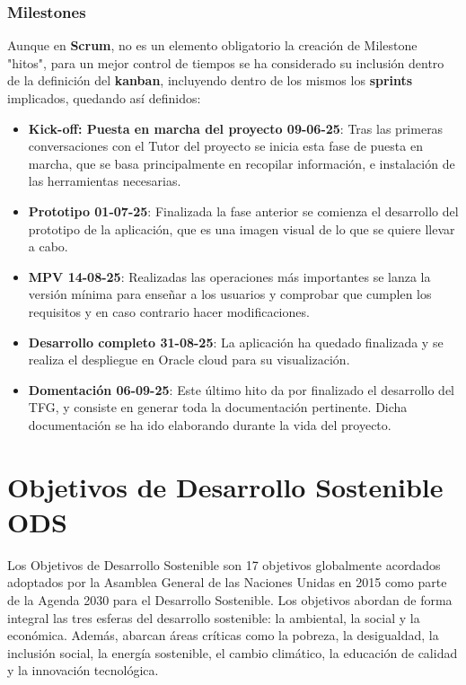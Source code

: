 \subsubsection{Milestones}
Aunque en \textbf{Scrum}, no es un elemento obligatorio la creación de \gls{Milestone} "hitos", para un mejor control de tiempos se ha considerado su inclusión dentro de la definición del \textbf{kanban}, incluyendo dentro de los mismos los \textbf{sprints} implicados, quedando así definidos:
\begin{itemize}
	\item \textbf{Kick-off: Puesta en marcha del proyecto 09-06-25}: Tras las primeras conversaciones con el Tutor del proyecto se inicia esta fase de puesta en marcha, que se basa principalmente en recopilar información, e instalación de las herramientas necesarias.
	\item \textbf{Prototipo 01-07-25}: Finalizada la fase anterior se comienza el desarrollo del prototipo de la aplicación, que es una imagen visual de lo que se quiere llevar a cabo.
	\item \textbf{\acrshort{MPV} 14-08-25}: Realizadas las operaciones más importantes se lanza la versión mínima para enseñar a los usuarios y comprobar que cumplen los requisitos y en caso contrario hacer modificaciones.
	\item \textbf{Desarrollo completo 31-08-25}: La aplicación ha quedado finalizada y se realiza el despliegue en Oracle cloud para su visualización.
	\item \textbf{Domentación 06-09-25}: Este último hito da por finalizado el desarrollo del \acrshort{TFG}, y consiste en generar toda la documentación pertinente. Dicha documentación se ha ido elaborando durante la vida del proyecto.
\end{itemize}

\section{Objetivos de Desarrollo Sostenible  \acrshort{ODS}}
Los Objetivos de Desarrollo Sostenible son
17 objetivos globalmente acordados adoptados por la
Asamblea General de las Naciones Unidas en 2015 como
parte de la Agenda 2030 para el Desarrollo Sostenible.
Los objetivos abordan de forma integral las
tres esferas del desarrollo sostenible: la ambiental, la
social y la económica. Además, abarcan áreas críticas
como la pobreza, la desigualdad, la inclusión social, la
energía sostenible, el cambio climático, la educación
de calidad y la innovación tecnológica. ~\cite{MarkiegiIntegrandoODSGrado}

